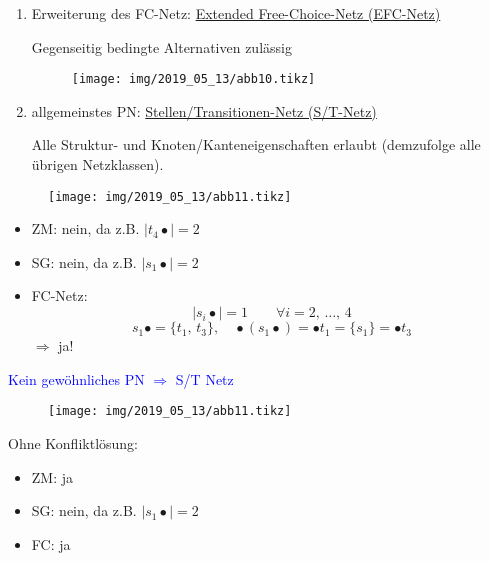\begin{enumerate}
	\item Erweiterung des FC-Netz: \underline{Extended Free-Choice-Netz (EFC-Netz)}
	
	Gegenseitig bedingte Alternativen zulässig
	\begin{figure}[H]
		\centering
		\texttt{[image: img/2019\_05\_13/abb10.tikz]}
	\end{figure}
	
	\item allgemeinstes PN: \underline{Stellen/Transitionen-Netz (S/T-Netz)}
	
	Alle Struktur- und Knoten/Kanteneigenschaften erlaubt (demzufolge alle übrigen Netzklassen).
\end{enumerate}

\begin{figure}[H]
	\centering
	\texttt{[image: img/2019\_05\_13/abb11.tikz]}
\end{figure}

\begin{itemize}
	\item ZM: nein, da z.B. $|t_4 \bullet| = 2$
	\item SG: nein, da z.B. $|s_1 \bullet| = 2$
	\item FC-Netz:
	\begin{equation}
		|s_i \bullet| = 1 \qquad \forall i=2,\,\ldots,\,4
	\end{equation}
	\begin{equation}
	s_1 \bullet = \{t_1,\,t_3\},\quad \bullet (s_1 \bullet) = \bullet t_1 = \{s_1\} = \bullet t_3
	\end{equation}
	$\Rightarrow$ ja!  
\end{itemize}

\textcolor{blue}{Kein gewöhnliches PN $\Rightarrow$ S/T Netz}

\begin{figure}[H]
	\centering
	\texttt{[image: img/2019\_05\_13/abb11.tikz]}
\end{figure}

Ohne Konfliktlösung:
\begin{itemize}
	\item ZM: ja
	\item SG: nein, da z.B. $|s_1 \bullet| = 2$
	\item FC: ja
\end{itemize}


